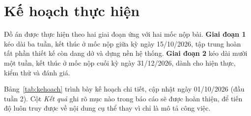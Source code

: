 \chapter*{Kế hoạch thực hiện}
\label{chap:kehoach}

Đồ án được thực hiện theo hai giai đoạn ứng với hai mốc nộp bài. \textbf{Giai đoạn 1} kéo dài ba tuần, kết thúc ở mốc nộp giữa kỳ ngày 15/10/2026, tập trung hoàn tất phần thiết kế còn dang dở và dựng nền hệ thống. \textbf{Giai đoạn 2} kéo dài mười một tuần, kết thúc ở mốc nộp cuối kỳ ngày 31/12/2026, dành cho hiện thực, kiểm thử và đánh giá.

Bảng~\ref{tab:kehoach} trình bày kế hoạch chi tiết, cập nhật ngày 01/10/2026 (đầu tuần 2). Cột \emph{Kết quả} ghi rõ mục nào trong báo cáo sẽ được hoàn thiện, để tiến độ luôn truy được về nội dung cụ thể thay vì chỉ là mô tả công việc.

